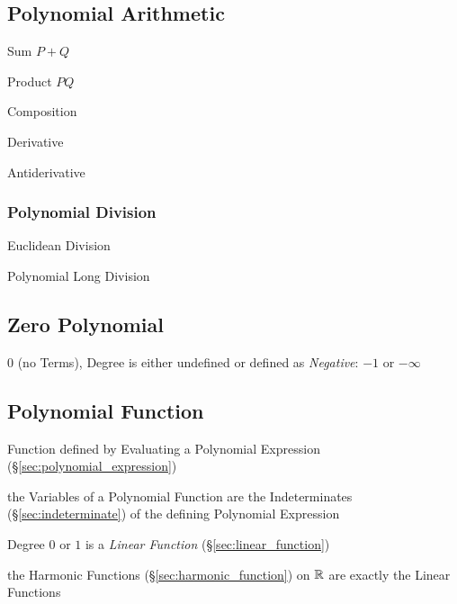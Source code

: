 \subsection{Polynomial Arithmetic}\label{sec:polynomial_arithmetic}

Sum $P + Q$

Product $P Q$

Composition

Derivative

Antiderivative



\subsubsection{Polynomial Division}\label{sec:polynomial_division}

Euclidean Division

Polynomial Long Division



\subsection{Zero Polynomial}\label{sec:zero_polynomial}

$0$ (no Terms), Degree is either undefined or defined as \emph{Negative}: $-1$
or $-\infty$



\subsection{Polynomial Function}\label{sec:polynomial_function}

Function defined by Evaluating a Polynomial Expression
(\S\ref{sec:polynomial_expression})

the Variables of a Polynomial Function are the Indeterminates
(\S\ref{sec:indeterminate}) of the defining Polynomial Expression

Degree $0$ or $1$ is a \emph{Linear Function} (\S\ref{sec:linear_function})

the Harmonic Functions (\S\ref{sec:harmonic_function}) on $\mathbb{R}$ are
exactly the Linear Functions


